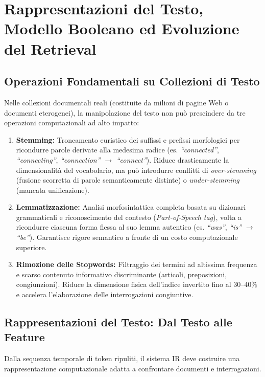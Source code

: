 \chapter{Rappresentazioni del Testo, Modello Booleano ed Evoluzione del Retrieval}
\label{chap:modelli-retrieval-tfidf}
\label{chap:text-representations-boolean}

\FloatBarrier
\section{Operazioni Fondamentali su Collezioni di Testo}
\label{sec:operazioni-collezioni-testo}

Nelle collezioni documentali reali (costituite da milioni di pagine Web o documenti eterogenei), la manipolazione del testo non pu\`o prescindere da tre operazioni computazionali ad alto impatto:
\begin{enumerate}
    \item \textbf{Stemming:} Troncamento euristico dei suffissi e prefissi morfologici per ricondurre parole derivate alla medesima radice (es. \textit{``connected''}, \textit{``connecting''}, \textit{``connection''} $\to$ \textit{``connect''}). Riduce drasticamente la dimensionalit\`a del vocabolario, ma pu\`o introdurre conflitti di \textit{over-stemming} (fusione scorretta di parole semanticamente distinte) o \textit{under-stemming} (mancata unificazione).
    \item \textbf{Lemmatizzazione:} Analisi morfosintattica completa basata su dizionari grammaticali e riconoscimento del contesto (\textit{Part-of-Speech tag}), volta a ricondurre ciascuna forma flessa al suo lemma autentico (es. \textit{``was''}, \textit{``is''} $\to$ \textit{``be''}). Garantisce rigore semantico a fronte di un costo computazionale superiore.
    \item \textbf{Rimozione delle Stopwords:} Filtraggio dei termini ad altissima frequenza e scarso contenuto informativo discriminante (articoli, preposizioni, congiunzioni). Riduce la dimensione fisica dell'indice invertito fino al $30\text{--}40\%$ e accelera l'elaborazione delle interrogazioni congiuntive.
\end{enumerate}

\FloatBarrier
\section{Rappresentazioni del Testo: Dal Testo alle Feature}
\label{sec:rappresentazioni-testo}

Dalla sequenza temporale di token ripuliti, il sistema IR deve costruire una rappresentazione computazionale adatta a confrontare documenti e interrogazioni.

